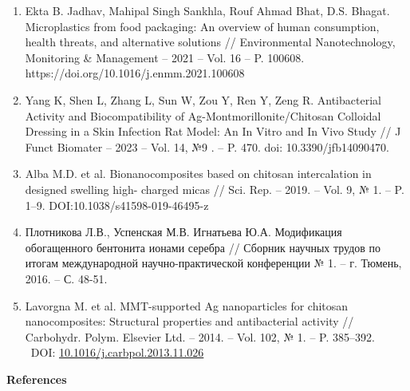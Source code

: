 \begin{enumerate}
\item
  Ekta B. Jadhav, Mahipal Singh Sankhla, Rouf Ahmad Bhat, D.S. Bhagat.
  Microplastics from food packaging: An overview of human consumption,
  health threats, and alternative solutions // Environmental
  Nanotechnology, Monitoring \& Management -- 2021 -- Vol. 16 -- P.
  100608. https://doi.org/10.1016/j.enmm.2021.100608
\item
  Yang K, Shen L, Zhang L, Sun W, Zou Y, Ren Y, Zeng R. Antibacterial
  Activity and Biocompatibility of Ag-Montmorillonite/Chitosan Colloidal
  Dressing in a Skin Infection Rat Model: An In Vitro and In Vivo Study
  // J Funct Biomater -- 2023 -- Vol. 14, №9 . -- P. 470. doi:
  10.3390/jfb14090470.
\item
  Alba M.D. et al. Bionanocomposites based on chitosan intercalation in
  designed swelling high- charged micas // Sci. Rep. -- 2019. -- Vol. 9,
  № 1. -- P. 1--9. DOI:10.1038/s41598-019-46495-z
\item
  Плотникова Л.В., Успенская М.В. Игнатьева Ю.А. Модификация
  обогащенного бентонита ионами серебра // Сборник научных трудов по
  итогам международной научно-практической конференции № 1. -- г.
  Тюмень, 2016. -- С. 48-51.
\item
  Lavorgna M. et al. MMT-supported Ag nanoparticles for chitosan
  nanocomposites: Structural properties and antibacterial activity //
  Carbohydr. Polym. Elsevier Ltd. -- 2014. -- Vol. 102, № 1. -- P.
  385--392. ~DOI:
  \href{https://doi.org/10.1016/j.carbpol.2013.11.026}{10.1016/j.carbpol.2013.11.026}
\end{enumerate}

{\bfseries References}

